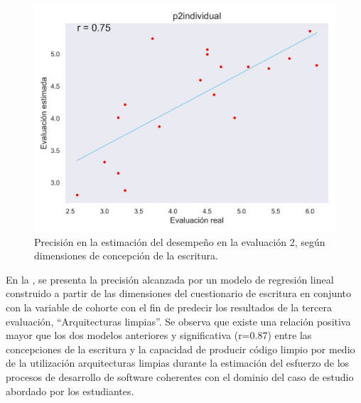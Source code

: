 \documentclass[spanish]{textolivre}
\begin{document}
\begin{figure}[H]
\centering
\begin{minipage}{.75\textwidth}
 \includegraphics[width=\textwidth]{figuras/figura8.png}
 \caption{Precisión en la estimación del desempeño en la evaluación 2, según dimensiones de concepción de la escritura.}
 \label{fig-modelo2}
\end{minipage}
\end{figure}


En la , se presenta la precisión alcanzada por un modelo de regresión lineal construido a partir de las dimensiones del cuestionario de escritura en conjunto con la variable de cohorte con el fin de predecir los resultados de la tercera evaluación, “Arquitecturas limpias”. Se observa que existe una relación positiva mayor que los dos modelos anteriores y significativa (r=0.87) entre las concepciones de la escritura y la capacidad de producir código limpio por medio de la utilización arquitecturas limpias durante la estimación del esfuerzo de los procesos de desarrollo de software coherentes con el dominio del caso de estudio abordado por los estudiantes. 
\end{document}
